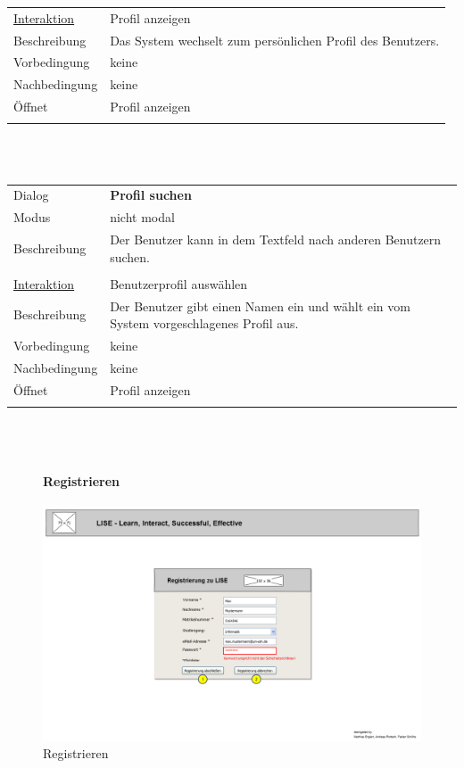 \documentclass[12pt,a4paper]{article}
\begin{document}
{\begin{tabular}{l p{12cm}}
\underline{Interaktion} 	 & Profil anzeigen\\ 
Beschreibung   	 & Das System wechselt zum persönlichen Profil des Benutzers.\\
Vorbedingung	& keine \\
Nachbedingung	& keine \\
Öffnet			& \glqq Profil anzeigen\grqq \\\\
\end{tabular}\\\\

\begin{tabular}{l p{12cm}}
Dialog 	 & \textbf{Profil suchen} \\ 
Modus & nicht modal\\ 
Beschreibung   	 & Der Benutzer kann in dem Textfeld nach anderen Benutzern suchen.\\\\

\underline{Interaktion} 	 & Benutzerprofil auswählen\\ 
Beschreibung   	 & Der Benutzer gibt einen Namen ein und wählt ein vom System vorgeschlagenes Profil aus.\\
Vorbedingung	& keine \\
Nachbedingung	& keine \\
Öffnet			& \glqq Profil anzeigen\grqq \\\\

\end{tabular}\\\\

\begin{figure}[H]
	\centering
	\paragraph{Registrieren}
	\includegraphics[width=\textwidth]{Bilder/Mockups/GUI/Registrierung.png}
	\caption{Registrieren}
	\label{GuiRegistrieren}
\end{figure}

}
\end{document}
